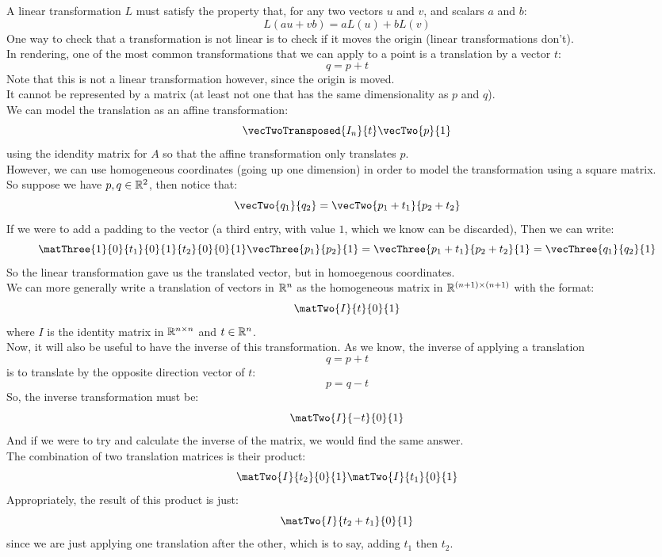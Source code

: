 \documentclass[12pt]{article}
\begin{document}
A linear transformation $L$ must satisfy the
property that, for any two vectors $u$ and $v$,
and scalars $a$ and $b$:
\[ L(au + vb) = aL(u) + bL(v) \]
One way to check that a transformation is not linear
is to check if it moves the origin (linear
transformations don't). \\

In rendering, one of the most common transformations
that we can apply to a point is a translation
by a vector $t$:
\[ q = p + t \]
Note that this is not a linear transformation however,
since the origin is moved. \\
It cannot be represented by a matrix
(at least not one that has the same dimensionality
as $p$ and $q$). \\

We can model the translation as an affine
transformation:
\[ \vecTwoTransposed{I_n}{t}\vecTwo{p}{1} \]
using the idendity matrix for $A$
so that the affine transformation only translates
$p$. \\

However, we can use homogeneous coordinates
(going up one dimension)
in order to model the transformation using a 
square matrix. \\
So suppose we have $p, q \in \mathbb{R}^2$,
then notice that:
\[ \vecTwo{q_1}{q_2} = \vecTwo{p_1 + t_1}{p_2 + t_2} \]
If we were to add a padding to the vector
(a third entry, with value $1$, 
which we know can be discarded),
Then we can write:
\[ \matThree{1}{0}{t_1}{0}{1}{t_2}{0}{0}{1}
\vecThree{p_1}{p_2}{1} = \vecThree{p_1 + t_1}{p_2 + t_2}{1}
= \vecThree{q_1}{q_2}{1} \]
So the linear transformation gave us the translated vector,
but in homoegenous coordinates. \\
We can more generally write a translation of
vectors in $\mathbb{R}^n$ as the homogeneous matrix in
$\mathbb{R}^{(n+1) \times (n+1)}$ with the format:
\[ \matTwo{I}{t}{0}{1} \]
where $I$ is the identity matrix in $\mathbb{R}^{n \times n}$
and $t \in \mathbb{R}^n$. \\

Now, it will also be useful to have the inverse of this
transformation.
As we know, the inverse of applying a translation
\[ q = p + t \]
is to translate by the opposite direction vector of $t$:
\[ p = q - t \]
So, the inverse transformation must be:
\[ \matTwo{I}{-t}{0}{1} \]
And if we were to try and calculate the inverse of the
matrix, we would find the same answer. \\

The combination of two translation matrices
is their product:
\[ \matTwo{I}{t_2}{0}{1}\matTwo{I}{t_1}{0}{1} \]
Appropriately, the result of this product is
just:
\[ \matTwo{I}{t_2 + t_1}{0}{1} \]
since we are just applying one translation
after the other,
which is to say, adding $t_1$ then $t_2$. \\
\end{document}
